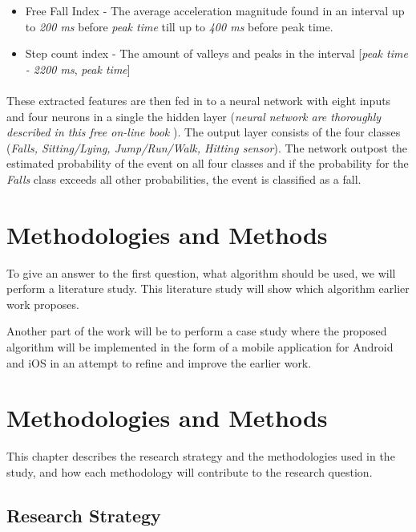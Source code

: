 \documentclass[12pt, a4paper, onecolumn]{article}
\begin{document}
\begin{itemize}
		\item{Free Fall Index} - The average acceleration magnitude found in an interval up to \textit{200 ms} before \textit{peak time} till up to \textit{400 ms} before peak time.
		
		\item{Step count index} - The amount of valleys and peaks in the interval [\textit{peak time - 2200 ms}, \textit{peak time}]
	\end{itemize}
	
	
	\paragraph{} These extracted features are then fed in to a neural network with eight inputs and four neurons in a single the hidden layer (\textit{neural network are thoroughly described in this free on-line book}  \cite{neural_networks}). The output layer consists of the four classes (\textit{Falls, Sitting/Lying, Jump/Run/Walk, Hitting sensor}). The network outpost the estimated probability of the event on all four classes and if the probability for the \textit{Falls}  class exceeds all other probabilities, the event is classified as a fall.
	
	
	\section{Methodologies and Methods}
	
	To give an answer to the first question, what algorithm should be used, we will perform a literature study. This literature study will show which algorithm earlier work proposes.
	
	Another part of the work will be to perform a case study where the proposed algorithm will be implemented in the form of a mobile application for Android and iOS in an attempt to refine and improve the earlier work.

	
\section{Methodologies and Methods}

This chapter describes the research strategy and the methodologies used in the study, and how each methodology will contribute to the research question.

\subsection{Research Strategy}
\end{document}

